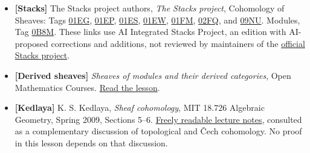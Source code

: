 \documentclass[11pt]{article}
\providecommand{\tightlist}{\setlength{\itemsep}{0pt}\setlength{\parskip}{0pt}}
\begin{document}
\begin{itemize}
\tightlist
\item
  \textbf{{[}Stacks{]}} The Stacks project authors, \emph{The Stacks
  project}, Cohomology of Sheaves: Tags
  \href{https://kokunoyumeto.github.io/stacks-zh-hans-cn/en/cohomology.html\#cohomology-lemma-cech-h0}{01EG},
  \href{https://kokunoyumeto.github.io/stacks-zh-hans-cn/en/cohomology.html\#cohomology-lemma-injective-trivial-cech}{01EP},
  \href{https://kokunoyumeto.github.io/stacks-zh-hans-cn/en/cohomology.html\#cohomology-lemma-cech-spectral-sequence}{01ES},
  \href{https://kokunoyumeto.github.io/stacks-zh-hans-cn/en/cohomology.html\#cohomology-lemma-cech-vanish-basis}{01EW},
  \href{https://kokunoyumeto.github.io/stacks-zh-hans-cn/en/cohomology.html\#cohomology-lemma-alternating-usual}{01FM},
  \href{https://kokunoyumeto.github.io/stacks-zh-hans-cn/en/cohomology.html\#cohomology-lemma-torsors-h1}{02FQ},
  and
  \href{https://kokunoyumeto.github.io/stacks-zh-hans-cn/en/cohomology.html\#cohomology-lemma-h1-invertible}{09NU}.
  Modules, Tag
  \href{https://kokunoyumeto.github.io/stacks-zh-hans-cn/en/modules.html\#modules-lemma-invertible-is-locally-free-rank-1}{0B8M}.
  These links use AI Integrated Stacks Project, an edition with
  AI-proposed corrections and additions, not reviewed by maintainers of
  the \href{https://stacks.math.columbia.edu/}{official Stacks project}.
\item
  \textbf{{[}Derived sheaves{]}} \emph{Sheaves of modules and their
  derived categories}, Open Mathematics Courses.
  \href{https://kokunoyumeto.github.io/open-math-courses/courses/derived-categories-and-sheaf-operations/injective-modules-and-bounded-below-derived-functors.html}{Read
  the lesson}.
\item
  \textbf{{[}Kedlaya{]}} K. S. Kedlaya, \emph{Sheaf cohomology}, MIT
  18.726 Algebraic Geometry, Spring 2009, Sections 5--6.
  \href{https://ocw.mit.edu/courses/18-726-algebraic-geometry-spring-2009/229cc8828f78826305f46b132314656e_MIT18_726s09_lec17_sheafcoh.pdf}{Freely
  readable lecture notes}, consulted as a complementary discussion of
  topological and Čech cohomology. No proof in this lesson depends on
  that discussion.
\end{itemize}
\end{document}
